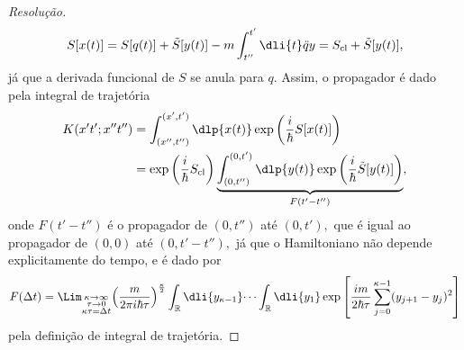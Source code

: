 \begin{proof}[Resolução]
   \begin{equation*}
      S[x(t)] = S[q(t)] + \tilde{S}[y(t)] - m \int_{t''}^{t'}\dli{t} \ddot{q} y = S_{\mathrm{cl}} + \tilde{S}[y(t)],
   \end{equation*}
   já que a derivada funcional de \(S\) se anula para \(q\). Assim, o propagador é dado pela integral de trajetória
   \begin{align*}
      K(x't'; x''t'') &= \int_{(x'', t'')}^{(x', t')} \dlp{x(t)} \exp\left(\frac{i}{\hbar} S[x(t)]\right)\\
                      &= \exp\left(\frac{i}{\hbar}S_{\mathrm{cl}}\right)\underbrace{\int_{(0,t'')}^{(0,t')} \dlp{y(t)} \exp\left(\frac{i}{\hbar} \tilde{S}[y(t)]\right)}_{F( t' - t'')},
   \end{align*}
   onde \(F(t' - t'')\) é o propagador de \((0,t'')\) até \((0, t'),\) que é igual ao propagador de \((0,0)\) até \((0, t' - t''),\) já que o Hamiltoniano não depende explicitamente do tempo, e é dado por
   \begin{equation*}
      F(\Delta t) = \Lim_{\substack{\kappa \to \infty\\ \tau \to 0\\ \kappa \tau = \Delta t}}{\left(\frac{m}{2\pi i \hbar \tau}\right)^{\frac\kappa2}\int_{\mathbb{R}} \dli{y_{\kappa - 1}} \dots \int_{\mathbb{R}} \dli{y_1} \exp\left[\frac{im}{2 \hbar \tau} \sum_{j = 0}^{\kappa - 1}(y_{j+1} - y_j)^2\right]}
   \end{equation*}
   pela definição de integral de trajetória.


\end{proof}

